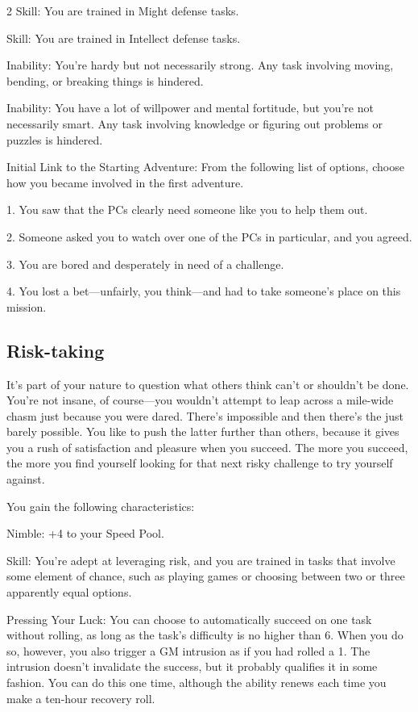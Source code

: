 \begin{multicols}{2}
Skill: You are trained in Might defense tasks.

Skill: You are trained in Intellect defense tasks.

Inability: You’re hardy but not necessarily strong. Any task involving moving, bending, or breaking things is hindered.

Inability: You have a lot of willpower and mental fortitude, but you’re not necessarily smart. Any task involving knowledge or figuring out problems or puzzles is hindered.

Initial Link to the Starting Adventure: From the following list of options, choose how you became involved in the first adventure.

1. You saw that the PCs clearly need someone like you to help them out.

2. Someone asked you to watch over one of the PCs in particular, and you agreed.

3. You are bored and desperately in need of a challenge.

4. You lost a bet—unfairly, you think—and had to take someone’s place on this mission.

\subsection{Risk-taking}

It’s part of your nature to question what others think can’t or shouldn’t be done. You’re not insane, of course—you wouldn’t attempt to leap across a mile-wide chasm just because you were dared. There’s impossible and then there’s the just barely possible. You like to push the latter further than others, because it gives you a rush of satisfaction and pleasure when you succeed. The more you succeed, the more you find yourself looking for that next risky challenge to try yourself against.

You gain the following characteristics:

Nimble: +4 to your Speed Pool.

Skill: You’re adept at leveraging risk, and you are trained in tasks that involve some element of chance, such as playing games or choosing between two or three apparently equal options.

Pressing Your Luck: You can choose to automatically succeed on one task without rolling, as long as the task’s difficulty is no higher than 6. When you do so, however, you also trigger a GM intrusion as if you had rolled a 1. The intrusion doesn’t invalidate the success, but it probably qualifies it in some fashion. You can do this one time, although the ability renews each time you make a ten-hour recovery roll.


\end{multicols}
